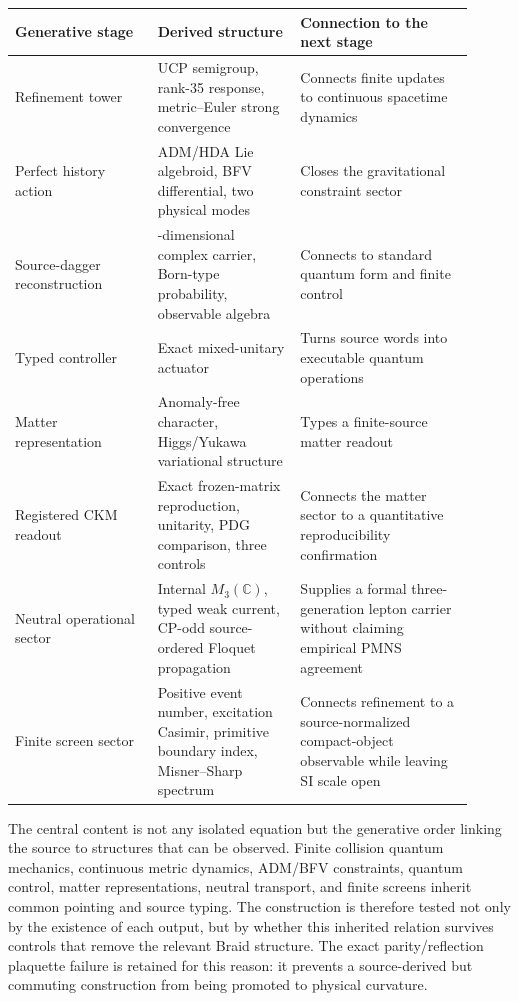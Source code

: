 \documentclass[11pt]{article}
\theoremstyle{definition}
\theoremstyle{remark}
\begin{document}
\newpage
\begin{tabularx}{\linewidth}{>{\raggedright\arraybackslash}p{0.28\linewidth} >{\raggedright\arraybackslash}p{0.29\linewidth} >{\raggedright\arraybackslash}p{0.34\linewidth}}
\toprule
Generative stage & Derived structure & Connection to the next stage \\
\midrule
Refinement tower & UCP semigroup, rank-35 response, metric--Euler strong convergence & Connects finite updates to continuous spacetime dynamics \\
Perfect history action & ADM/HDA Lie algebroid, BFV differential, two physical modes & Closes the gravitational constraint sector \\
Source-dagger reconstruction & 36-dimensional complex carrier, Born-type probability, observable algebra & Connects to standard quantum form and finite control \\
Typed controller & Exact mixed-unitary actuator & Turns source words into executable quantum operations \\
Matter representation & Anomaly-free character, Higgs/Yukawa variational structure & Types a finite-source matter readout \\
Registered CKM readout & Exact frozen-matrix reproduction, unitarity, PDG comparison, three controls & Connects the matter sector to a quantitative reproducibility confirmation \\
Neutral operational sector & Internal $M_3(\mathbb C)$, typed weak current, CP-odd source-ordered Floquet propagation & Supplies a formal three-generation lepton carrier without claiming empirical PMNS agreement \\
Finite screen sector & Positive event number, excitation Casimir, primitive boundary index, Misner--Sharp spectrum & Connects refinement to a source-normalized compact-object observable while leaving SI scale open \\
\bottomrule
\end{tabularx}

The central content is not any isolated equation but the generative order linking the source to structures that can be observed. Finite collision quantum mechanics, continuous metric dynamics, ADM/BFV constraints, quantum control, matter representations, neutral transport, and finite screens inherit common pointing and source typing. The construction is therefore tested not only by the existence of each output, but by whether this inherited relation survives controls that remove the relevant Braid structure. The exact parity/reflection plaquette failure is retained for this reason: it prevents a source-derived but commuting construction from being promoted to physical curvature.
\end{document}
